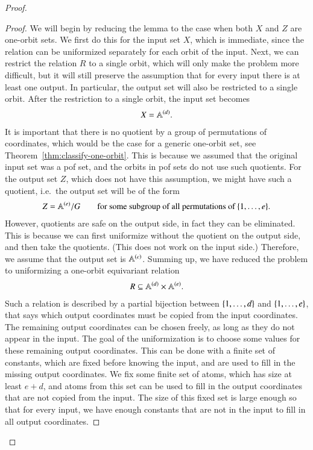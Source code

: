 \begin{proof}
\begin{proof}
        
        We will begin by reducing the lemma to the case when both $X$ and $Z$ are one-orbit sets. We first do this for the input set  $X$, which is immediate, since the relation can be uniformized separately for each orbit of the input. Next, we can restrict the relation $R$ to a single orbit, which will only make the problem more difficult, but it will still preserve the assumption that for every input there is at least one output. In particular, the output set will also be restricted to a single orbit. After the restriction to  a single orbit, the input set becomes
        \begin{align*}
        X = \mathbb A^{(d)}.
        \end{align*}
        It is important that there is no quotient by a group of permutations of coordinates, which would be the case for a generic one-orbit set, see Theorem~\ref{thm:classify-one-orbit}. This is because we assumed  that the original  input set was a pof set, and the orbits in pof sets do not use such quotients.  
        For the output set $Z$, which does not have this assumption,  we might have such a quotient, i.e.~the output set will be of the form 
        \begin{align*}
        Z = \mathbb A^{(e)} / G \qquad \text{for some subgroup of all permutations of $\{1,\ldots,e\}$}.
        \end{align*}
        However, quotients are safe on the output side, in fact they can be eliminated. This is because we can first uniformize without the quotient on the output side, and then take the quotients. (This does not work on the input side.) Therefore, we assume that the output set is $\mathbb A^{(e)}$. Summing up, we have reduced the problem to uniformizing a one-orbit equivariant relation 
        \begin{align*}
        R \subseteq \mathbb A^{(d)} \times \mathbb A^{(e)}.
        \end{align*}
        Such a relation is described by a partial bijection between $\{1,\ldots,d\}$ and $\{1,\ldots,e\}$, that  says which output coordinates must be copied from the input coordinates. The remaining output coordinates can be chosen freely, as long as they do not appear in the input. The goal of the uniformization is to choose some values for these remaining output coordinates. This can be done with a finite set of constants, which are fixed before knowing the input, and are used  to fill in the missing output coordinates.  We fix some finite set of atoms, which has size at least $e+d$, and atoms from this set can be used to fill in the output coordinates that are not copied from the input. The size of this fixed set is large enough so that for every input, we have enough constants that are not in the input to fill in all output  coordinates.
    \end{proof}

\end{proof}